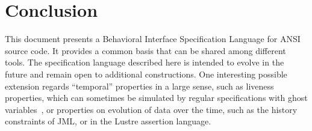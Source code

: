 
\chapter{Conclusion}

This document presents a Behavioral Interface Specification Language
for ANSI \lang{} source code. It provides a common basis that can be
shared among different tools.
The specification language described here is intended to evolve in the
future and remain open to additional constructions.
One interesting possible extension regards ``temporal''
properties in a large sense, such as liveness properties, which can
sometimes be simulated by regular specifications with ghost
variables~\cite{giorgetti06fase}, or properties on evolution of data
over the time, such as the history constraints of JML, or in the Lustre
assertion language.

